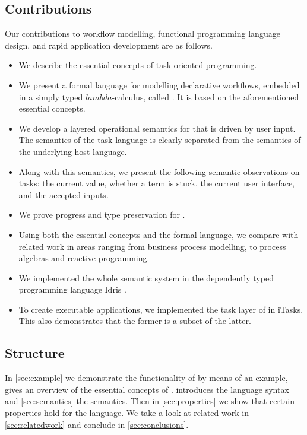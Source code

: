\subsection{Contributions}

Our contributions to workflow modelling, functional programming language design, and rapid application development are as follows.


\begin{itemize}
  \item
    We describe the essential concepts of task-oriented programming.

  \item
    We present a formal language for modelling declarative workflows, embedded in a simply typed $lambda$-calculus, called \TOPHAT.
    It is based on the aforementioned essential \TOP concepts.

  \item
    We develop a layered operational semantics for \TOPHAT that is driven by user input.
    The semantics of the task language is clearly separated from the semantics of the underlying host language.

  \item
    Along with this semantics, we present the following semantic observations on tasks:
    the current value, whether a term is stuck, the current user interface, and the accepted inputs.

  \item
    We prove progress and type preservation for \TOPHAT.

  \item
    Using both the essential concepts and the formal language, we compare \TOP with related work in areas ranging from business process modelling, to process algebras and reactive programming.

  \item
    We implemented the whole semantic system in the dependently typed programming language Idris \cite{journals/jfp/Brady13}.

  \item
    To create executable applications, we implemented the task layer of \TOPHAT in iTasks.
    This also demonstrates that the former is a subset of the latter.


\end{itemize}


\subsection{Structure}

In \cref{sec:example} we demonstrate the functionality of \TOPHAT by means of an example,
 gives an overview of the essential concepts of \TOP.
 introduces the \TOPHAT language syntax
and \cref{sec:semantics} the semantics.
Then in \cref{sec:properties} we show that certain properties hold for the language.
We take a look at related work in \cref{sec:relatedwork}
and conclude in \cref{sec:conclusions}.
